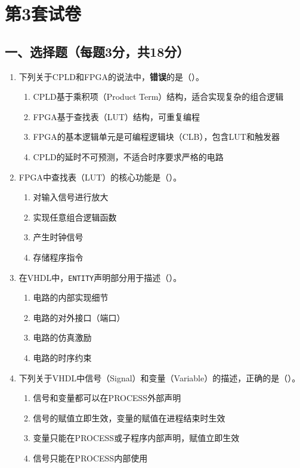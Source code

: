 \chapter{第3套试卷}

\section*{一、选择题（每题3分，共18分）}

\begin{enumerate}[label=\arabic*.]

\item 下列关于CPLD和FPGA的说法中，\textbf{错误}的是（\quad）。

\begin{enumerate}[label=\Alph*.]
  \item CPLD基于乘积项（Product Term）结构，适合实现复杂的组合逻辑
  \item FPGA基于查找表（LUT）结构，可重复编程
  \item FPGA的基本逻辑单元是可编程逻辑块（CLB），包含LUT和触发器
  \item CPLD的延时不可预测，不适合时序要求严格的电路
\end{enumerate}

\item FPGA中查找表（LUT）的核心功能是（\quad）。

\begin{enumerate}[label=\Alph*.]
  \item 对输入信号进行放大
  \item 实现任意组合逻辑函数
  \item 产生时钟信号
  \item 存储程序指令
\end{enumerate}

\item 在VHDL中，\texttt{ENTITY}声明部分用于描述（\quad）。

\begin{enumerate}[label=\Alph*.]
  \item 电路的内部实现细节
  \item 电路的对外接口（端口）
  \item 电路的仿真激励
  \item 电路的时序约束
\end{enumerate}

\item 下列关于VHDL中信号（Signal）和变量（Variable）的描述，正确的是（\quad）。

\begin{enumerate}[label=\Alph*.]
  \item 信号和变量都可以在PROCESS外部声明
  \item 信号的赋值立即生效，变量的赋值在进程结束时生效
  \item 变量只能在PROCESS或子程序内部声明，赋值立即生效
  \item 信号只能在PROCESS内部使用
\end{enumerate}


\end{enumerate}

